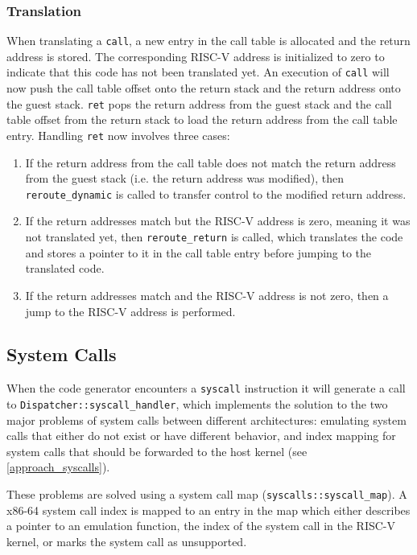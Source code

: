 	\subsubsection{Translation}	
		When translating a \texttt{call}, a new entry in the call table is allocated and the return address is stored. The corresponding RISC-V address is initialized to zero to indicate that this code has not been translated yet. An execution of \texttt{call} will now push the call table offset onto the return stack and the return address onto the guest stack.
		\texttt{ret} pops the return address from the guest stack and the call table offset from the return stack to load the return address from the call table entry.
		Handling \texttt{ret} now involves three cases:
		\begin{enumerate}
			\item If the return address from the call table does not match the return address from the guest stack (i.e. the return address was modified), then \texttt{reroute\_dynamic} is called to transfer control to the modified return address.
			\item If the return addresses match but the RISC-V address is zero, meaning it was not translated yet,  then \texttt{reroute\_return} is called, which translates the code and stores a pointer to it in the call table entry before jumping to the translated code.
			\item If the return addresses match and the RISC-V address is not zero, then a jump to the RISC-V address is performed.
		\end{enumerate}

\subsection{System Calls}
\label{documentation_syscalls}
	When the code generator encounters a \texttt{syscall} instruction it will generate a call to \texttt{Dispatcher::syscall\_handler}, which implements the solution to the two major problems of system calls between different architectures: emulating system calls that either do not exist or have different behavior, and index mapping for system calls that should be forwarded to the host kernel (see \ref{approach_syscalls}).

	These problems are solved using a system call map (\texttt{syscalls::syscall\_map}). A x86-64 system call index is mapped to an entry in the map which either describes a pointer to an emulation function, the index of the system call in the RISC-V kernel, or marks the system call as unsupported.
	
